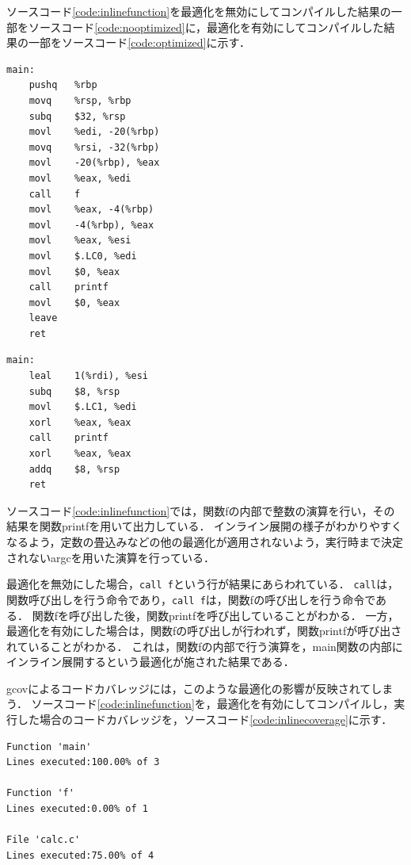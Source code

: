 \documentclass[graduation-thesis]{mlarticle}
\begin{document}
ソースコード\ref{code:inlinefunction}を最適化を無効にしてコンパイルした結果の一部をソースコード\ref{code:nooptimized}に，最適化を有効にしてコンパイルした結果の一部をソースコード\ref{code:optimized}に示す．

\begin{lstlisting}[language={[x86masm]Assembler}, caption=最適化を無効にしたコンパイル結果, label=code:nooptimized]
main:
	pushq	%rbp
	movq	%rsp, %rbp
	subq	$32, %rsp
	movl	%edi, -20(%rbp)
	movq	%rsi, -32(%rbp)
	movl	-20(%rbp), %eax
	movl	%eax, %edi
	call	f
	movl	%eax, -4(%rbp)
	movl	-4(%rbp), %eax
	movl	%eax, %esi
	movl	$.LC0, %edi
	movl	$0, %eax
	call	printf
	movl	$0, %eax
	leave
	ret
\end{lstlisting}

\begin{lstlisting}[language={[x86masm]Assembler}, caption=最適化を有効にしたコンパイル結果, label=code:optimized]
main:
	leal	1(%rdi), %esi
	subq	$8, %rsp
	movl	$.LC1, %edi
	xorl	%eax, %eax
	call	printf
	xorl	%eax, %eax
	addq	$8, %rsp
	ret
\end{lstlisting}

ソースコード\ref{code:inlinefunction}では，関数fの内部で整数の演算を行い，その結果を関数printfを用いて出力している．
インライン展開の様子がわかりやすくなるよう，定数の畳込みなどの他の最適化が適用されないよう，実行時まで決定されないargcを用いた演算を行っている．

最適化を無効にした場合，\texttt{call f}という行が結果にあらわれている．
\texttt{call}は，関数呼び出しを行う命令であり，\texttt{call f}は，関数fの呼び出しを行う命令である．
関数fを呼び出した後，関数printfを呼び出していることがわかる．
一方，最適化を有効にした場合は，関数fの呼び出しが行われず，関数printfが呼び出されていることがわかる．
これは，関数fの内部で行う演算を，main関数の内部にインライン展開するという最適化が施された結果である．

gcovによるコードカバレッジには，このような最適化の影響が反映されてしまう．
ソースコード\ref{code:inlinefunction}を，最適化を有効にしてコンパイルし，実行した場合のコードカバレッジを，ソースコード\ref{code:inlinecoverage}に示す．

\begin{lstlisting}[caption=最適化を有効にした場合のgcovの出力, label=code:inlinecoverage]
Function 'main'
Lines executed:100.00% of 3

Function 'f'
Lines executed:0.00% of 1

File 'calc.c'
Lines executed:75.00% of 4
\end{lstlisting}
\end{document}
